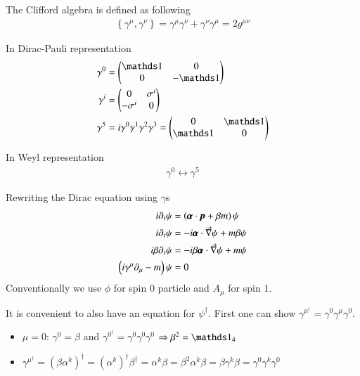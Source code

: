 The Clifford algebra is defined as following
\begin{align}
   \left\{ \gamma^\mu, \gamma^\nu \right\} = \gamma^\mu \gamma^\nu + \gamma^\nu \gamma^\mu = 2 g^{\mu\nu}
\end{align}

In Dirac-Pauli representation
\begin{align}
   \gamma^0 &= \begin{pmatrix} \id & 0 \\ 0 & -\id \end{pmatrix} \\
   \gamma^i &= \begin{pmatrix} 0 & \sigma^i \\ -\sigma^i & 0 \end{pmatrix} \\
   \gamma^5 &= i \gamma^0 \gamma^1 \gamma^2 \gamma^3 = \begin{pmatrix} 0 & \id \\ \id & 0\end{pmatrix}
\end{align}

In Weyl representation 
\begin{align*}
   \gamma^0 \leftrightarrow \gamma^5
\end{align*}

Rewriting the Dirac equation using $\gamma$s
\begin{align}
   i \partial_t \psi &= \left( \pmb{\alpha} \cdot \pmb{p} + \beta m  \right) \psi \notag\\
   i \partial_t \psi &= -i \pmb{\alpha} \cdot \vec{\nabla} \psi + m \beta \psi \notag\\
   i \beta \partial_t \psi &= -i \beta \pmb{\alpha} \cdot \vec{\nabla} \psi + m \psi \notag\\
   \left(i\gamma^\mu \partial_\mu - m \right) \psi &= 0
\end{align}
Conventionally we use $\phi$ for spin $0$ particle and $A_\mu$ for spin $1$.

It is convenient to also have an equation for $\psi^\dagger$. First one can show $\gamma^\mu^\dagger = \gamma^0 \gamma^\mu \gamma^0$.
\begin{itemize}
   \item $\mu = 0$: $\gamma^0 = \beta$ and $\gamma^0^\dagger = \gamma^0 \gamma^0 \gamma^0$ $\Rightarrow \beta^2 = \id_4$
   \item $\gamma^\mu^\dagger = (\beta \alpha^k)^\dagger = (\alpha^k)^\dagger \beta^\dagger = \alpha^k \beta = \beta^2 \alpha^k \beta = \beta \gamma^k \beta = \gamma^0 \gamma^k \gamma^0$
\end{itemize}

